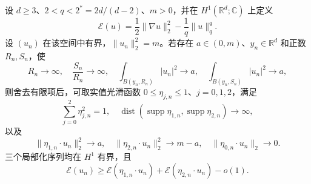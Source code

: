 \begin{lemma}
\label{b2:lem:F-ims-split}
设 \(d\ge3\)、\(2<q<2^*=2d/(d-2)\)、\(m>0\)，并在
\(H^1(\mathbb R^d;\mathbb C)\) 上定义
\[
 \mathcal E(u)=\frac12\|\nabla u\|_2^2-\frac1q\|u\|_q^q.
\]
设 \((u_n)\) 在该空间中有界，\(\|u_n\|_2^2=m\)。若存在
\(a\in(0,m)\)、\(y_n\in\mathbb R^d\) 和正数 \(R_n,S_n\)，使
\[
 R_n\longrightarrow\infty,\quad \frac{S_n}{R_n}\longrightarrow\infty,
 \quad
 \int_{B(y_n,R_n)}|u_n|^2\longrightarrow a,
 \quad
 \int_{B(y_n,S_n)}|u_n|^2\longrightarrow a,
\]
则舍去有限项后，可取实值光滑函数 \(0\le\eta_{j,n}\le1\)、\(j=0,1,2\)，满足
\[
 \sum_{j=0}^2\eta_{j,n}^2=1,\quad
 \operatorname{dist}(\operatorname{supp}\eta_{1,n},
                     \operatorname{supp}\eta_{2,n})\longrightarrow\infty,
\]
以及
\[
 \|\eta_{1,n}\cdot u_n\|_2^2\longrightarrow a,\quad
 \|\eta_{2,n}\cdot u_n\|_2^2\longrightarrow m-a,\quad
 \|\eta_{0,n}\cdot u_n\|_2\longrightarrow0.
\]
三个局部化序列均在 \(H^1\) 有界，且
\[
 \mathcal E(u_n)\ge
 \mathcal E(\eta_{1,n}\cdot u_n)
 +\mathcal E(\eta_{2,n}\cdot u_n)-o(1).
\]
\end{lemma}
